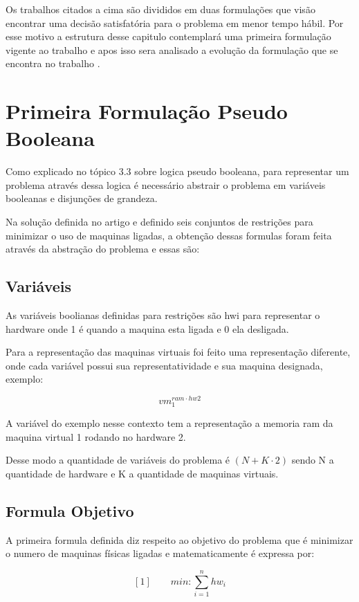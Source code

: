 Os trabalhos citados a cima são divididos em duas formulações que visão encontrar uma decisão satisfatória para o problema em menor tempo hábil. Por esse motivo a estrutura desse capitulo contemplará uma primeira formulação vigente ao trabalho \cite{bruno2012} e apos isso sera analisado a evolução da formulação que se encontra no trabalho \cite{bruno2013}. 


\section{Primeira Formulação Pseudo Booleana}

Como explicado no tópico 3.3 sobre logica pseudo booleana, para representar um problema através dessa logica é necessário abstrair o problema em variáveis booleanas e disjunções de grandeza.

Na solução definida no artigo \cite{bruno2012} e definido seis conjuntos de restrições para minimizar o uso de maquinas ligadas, a obtenção dessas formulas foram feita através da abstração do problema e essas são:
 
 \subsection{Variáveis}

As variáveis boolianas definidas para restrições são hwi para representar o hardware onde 1 é quando a maquina esta ligada e 0 ela desligada.

Para a representação das maquinas virtuais foi feito uma representação diferente, onde cada variável possui sua representatividade e sua maquina designada, exemplo:

$$ vm_1^{ram \cdot hw2}$$

A variável do exemplo nesse contexto tem a representação a memoria ram da maquina virtual 1 rodando no hardware 2.

Desse modo a quantidade de variáveis do problema é $(N + K \cdot 2)$ sendo N a quantidade de hardware e K a quantidade de maquinas virtuais.
 
 \subsection{Formula Objetivo}
 
 A primeira formula definida diz respeito ao objetivo do problema que é minimizar o numero de maquinas físicas ligadas e matematicamente é expressa por: 
 
 $$[1] \qquad min: \sum_{i=1}^{n} hw_{i}$$	


